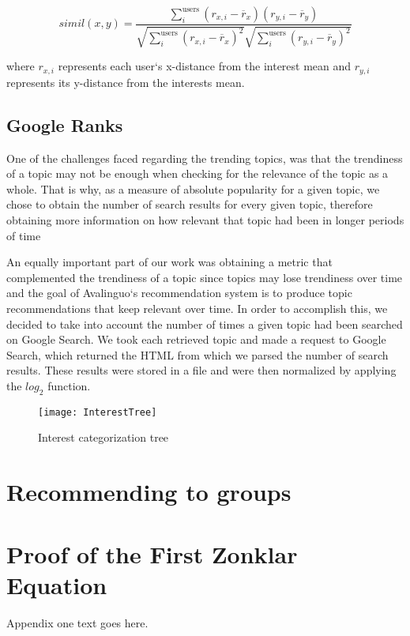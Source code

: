 \documentclass[journal]{IEEEtran}
\begin{document}
\[
simil(x,y)=
\frac{\sum_{i}^{\text{users}} ({r}_{x,i} - \overline{r}_{x}) 
({r}_{y,i} - \overline{r}_{y})
}
{\sqrt{ \sum_{i}^{\text{users}} ({r}_{x, i} - \overline{r}_{x} )^2 }
\sqrt{ \sum_{i}^{\text{users}} ({r}_{y, i} - \overline{r}_{y} )^2 }
}
\]

where ${r}_{x,i}$ represents each user`s x-distance from the interest
mean and ${r}_{y,i}$ represents its y-distance from the interests mean.

\subsection{Google Ranks}

One of the challenges faced regarding the trending topics, was that the
trendiness of a topic  may not be enough when checking for the relevance
of the topic as a whole. That is why, as a measure of absolute
popularity for a given topic, we chose to obtain the number of search
results for every given topic, therefore obtaining more information on
how relevant that topic had been in longer periods of time

An equally important part of our work was obtaining a metric that
complemented the trendiness of a topic since topics may lose trendiness
over time and the goal of Avalinguo`s recommendation system is to
produce topic recommendations that keep relevant over time. In order to
accomplish this, we decided to take into account the number of times a
given topic had been searched on Google Search. We took each retrieved
topic and made a request to Google Search, which returned the HTML from
which we parsed the number of search results. These results were stored
in a file and were then normalized by applying the ${log}_{2}$ function.

\begin{figure}
    \centering
    \texttt{[image: InterestTree]}
    \caption{Interest categorization tree}
    \label{fig:interest_tree}
\end{figure}

\section{Recommending to groups}

\appendices

\section{Proof of the First Zonklar Equation}
Appendix one text goes here.
\end{document}
